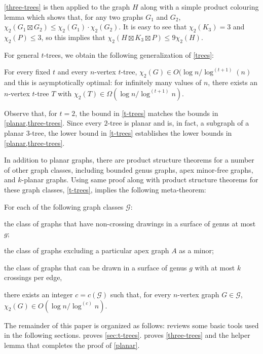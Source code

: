 \documentclass[kpfonts]{patmorin}
\newcommand{\uqs}{\chi_2}
\theoremstyle{named}
\begin{document}
\cref{three-trees} is then applied to the graph $H$ along with a simple product colouring lemma which shows that, for any two graphs $G_1$ and $G_2$, $\uqs(G_1\boxtimes G_2)\le \uqs(G_1)\cdot\uqs(G_2)$. It is easy to see that $\uqs(K_3)=3$ and $\uqs(P)\le 3$, so this implies that $\uqs(H\boxtimes K_3\boxtimes P)\le 9\uqs(H)$.

For general $t$-trees, we obtain the following generalization of \cref{trees}:

\begin{thm}\label{t-trees}
    For every fixed $t$ and every $n$-vertex $t$-tree, $\uqs(G) \in O(\log n/\log^{(t+1)}(n)$ and this is asymptotically optimal: for infinitely many values of $n$, there exists an $n$-vertex $t$-tree $T$ with $\uqs(T)\in\Omega(\log n/\log^{(t+1)} n)$.
\end{thm}

Observe that, for $t=2$, the bound in \cref{t-trees} matches the bounds in \cref{planar,three-trees}.  Since every $2$-tree is planar and is, in fact, a subgraph of a planar $3$-tree, the lower bound in \cref{t-trees} establishes the lower bounds in \cref{planar,three-trees}.

In addition to planar graphs, there are product structure theorems for a number of other graph classes, including bounded genus graphs, apex minor-free graphs, and $k$-planar graphs.  Using same proof along with product structure theorems for these graph classes, \cref{t-trees}, implies the following meta-theorem:

\begin{thm}\label{meta-theorem}
    For each of the following graph classes $\mathcal{G}$:
    \begin{compactenum}
        \item the class of graphs that have non-crossing drawings in a surface of genus at most $g$;
        \item the class of graphs excluding a particular apex graph $A$ as a minor;
        \item the class of graphs that can be drawn in a surface of genus $g$ with at most $k$ crossings per edge,
    \end{compactenum}
    there exists an integer $c=c(\mathcal{G})$ such that, for every $n$-vertex graph $G\in\mathcal{G}$, $\uqs(G)\in O(\log n/\log^{(c)} n)$.
\end{thm}

The remainder of this paper is organized as follows:  reviews some basic tools used in the following sections.  proves \cref{sec:t-trees}.  proves \cref{three-trees} and the helper lemma that completes the proof of \cref{planar}.
\end{document}
